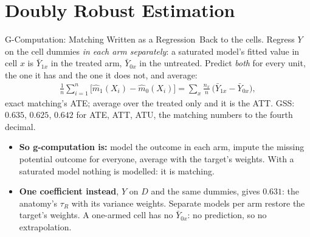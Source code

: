 \documentclass[aspectratio=169,11pt,xcolor=dvipsnames]{beamer}
\newcommand{\core}{\,\raisebox{0.6pt}{\textcolor{corestar}{$\bigstar$}}}
\begin{document}
\section[Doubly Robust]{Doubly Robust Estimation}
\begin{frame}\sectionpage\end{frame}

\begin{frame}{G-Computation: Matching Written as a Regression\core}
Back to the cells. Regress $Y$ on the cell dummies \emph{in each arm
separately}: a saturated model's fitted value in cell $x$ is $\bar Y_{1x}$ in
the treated arm, $\bar Y_{0x}$ in the untreated. Predict \emph{both} for every
unit, the one it has and the one it does not, and average:
\begin{align*}
  \frac1n\sum_{i=1}^n \big[\hat m_1(X_i) - \hat m_0(X_i)\big]
  = \sum_x \frac{n_x}{n}\,\big(\bar Y_{1x} - \bar Y_{0x}\big),
\end{align*}
exact matching's ATE; average over the treated only and it is the ATT. GSS:
$0.635$, $0.625$, $0.642$ for ATE, ATT, ATU, the matching numbers to the
fourth decimal.
\begin{itemize}\itemsep2pt
  \item \textbf{So g-computation is:} model the outcome in each arm, impute
        the missing potential outcome for everyone, average with the target's
        weights. With a saturated model nothing is modelled: it is matching.
  \item \textbf{One coefficient instead}, $Y$ on $D$ and the same dummies,
        gives $0.631$: the anatomy's $\tau_R$ with its variance weights.
        Separate models per arm restore the target's weights. A one-armed
        cell has no $\bar Y_{0x}$: no prediction, so no extrapolation.
\end{itemize}
\end{frame}
\end{document}
